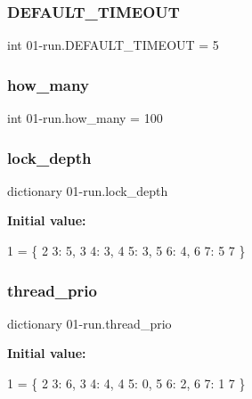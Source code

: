 \subsubsection{\texorpdfstring{D\+E\+F\+A\+U\+L\+T\+\_\+\+T\+I\+M\+E\+O\+UT}{DEFAULT\_TIMEOUT}}
{\footnotesize\ttfamily int 01-\/run.\+D\+E\+F\+A\+U\+L\+T\+\_\+\+T\+I\+M\+E\+O\+UT = 5}

\mbox{\label{namespace01-run_a8435ebde0e106380ca0c31a248ff48ae}} 
\subsubsection{\texorpdfstring{how\+\_\+many}{how\_many}}
{\footnotesize\ttfamily int 01-\/run.\+how\+\_\+many = 100}

\mbox{\label{namespace01-run_a3e90d7ea68b49e97ae68ba6b5faa5132}} 
\subsubsection{\texorpdfstring{lock\+\_\+depth}{lock\_depth}}
{\footnotesize\ttfamily dictionary 01-\/run.\+lock\+\_\+depth}

{\bfseries Initial value\+:}
\begin{DoxyCode}
1 =  \{
2         3:  5,
3         4:  3,
4         5:  3,
5         6:  4,
6         7:  5
7         \}
\end{DoxyCode}
\mbox{\label{namespace01-run_ad18970d15e0c79d88628872c2240e455}} 
\subsubsection{\texorpdfstring{thread\+\_\+prio}{thread\_prio}}
{\footnotesize\ttfamily dictionary 01-\/run.\+thread\+\_\+prio}

{\bfseries Initial value\+:}
\begin{DoxyCode}
1 =  \{
2         3:  6,
3         4:  4,
4         5:  0,
5         6:  2,
6         7:  1
7         \}
\end{DoxyCode}
